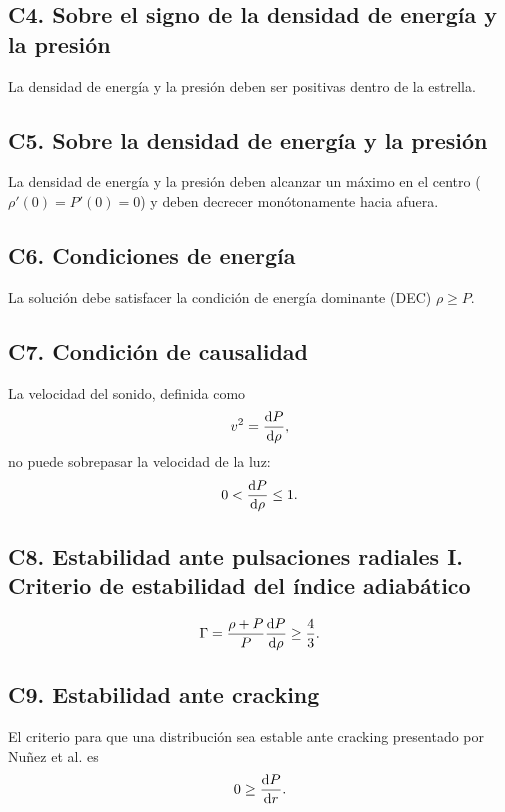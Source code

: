 \subsection*{C4. Sobre el signo de la densidad de energía y la presión}
La densidad de energía y la presión deben ser positivas dentro de la estrella.

\subsection*{C5. Sobre la densidad de energía y la presión}
La densidad de energía y la presión deben alcanzar un máximo en el centro ($\rho'(0)=P'(0)=0$) y deben decrecer monótonamente hacia afuera.

\subsection*{C6. Condiciones de energía}
La solución debe satisfacer la condición de energía dominante (DEC) $\rho \geq P$.
\subsection*{C7. Condición de causalidad}
La velocidad del sonido, definida como
\begin{equation}
    v^2=\dv{P}{\rho},
\end{equation}
no puede sobrepasar la velocidad de la luz:
\begin{equation}
    0 < \dv{P}{\rho} \leq 1 .
\end{equation}

\subsection*{C8. Estabilidad ante pulsaciones radiales I. Criterio de estabilidad del índice adiabático } 

\begin{equation}
    \Gamma = \frac { \rho + P  } { P } \dv{P}{\rho} \geq \frac{4}{3}.
\end{equation}

\subsection*{C9. Estabilidad ante cracking}
 El criterio para que una distribución sea estable ante cracking presentado por Nuñez et al. \cite{Gonzalez2014} es
\begin{equation}
    0 \geq \dv{P}{r}.
\end{equation}

